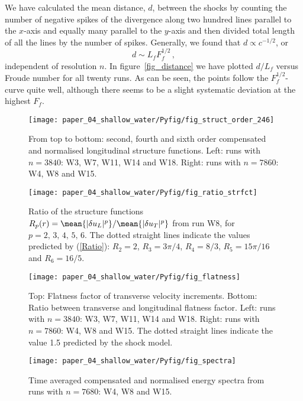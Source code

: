 We have calculated  the mean distance, $ d $, between the shocks by counting the number of negative spikes
of the divergence along two hundred lines parallel to the $ x $-axis and equally many 
parallel to the $ y $-axis and then divided total length of all the lines by
the number of spikes. Generally, we found that $ d \propto c^{-1/2} $, or
\begin{equation} \label{MeanDistance}
d \sim L_f F_f ^{1/2} \, ,
\end{equation}
independent of resolution $ n $. In figure~\ref{fig_distance} we have plotted
$ d/L_f $ versus Froude number for all twenty runs. As can be seen, the points
follow the $ F_f^{1/2} $-curve quite well, although there seems to be a slight
systematic deviation at the highest $ F_f $.

\begin{figure}[htp!]
\centerline{
\texttt{[image: paper\_04\_shallow\_water/Pyfig/fig\_struct\_order\_246]}}
\caption{From top to bottom: second, fourth and sixth order compensated and
normalised longitudinal structure functions. Left: runs with $ n=3840 $: W3,
W7, W11, W14 and W18. Right: runs with $ n = 7860 $: W4, W8 and W15. }
\label{fig_StrucFunc}
\end{figure}

\begin{figure}
\centerline{\texttt{[image: paper\_04\_shallow\_water/Pyfig/fig\_ratio\_strfct]}}
\caption{
Ratio of the structure functions
$R_p(r) = \mean{|\delta u_L|^p} / \mean{|\delta u_T|^p}$ from run W8,
for $ p = 2, \, 3, \, 4, \, 5, \, 6. $
The dotted straight lines indicate the values predicted by (\ref{Ratio}):
$R_2 = 2$, $R_3 = 3\pi/4$,  $R_4 = 8/3$, $ R_5 = 15 \pi /16 $ and $ R_6 = 16/5 $.}
\label{fig_ratio}
\end{figure}

\begin{figure}
\centerline{\texttt{[image: paper\_04\_shallow\_water/Pyfig/fig\_flatness]}}
\caption{ Top: Flatness factor of transverse velocity increments. Bottom: Ratio between transverse and longitudinal flatness factor. Left: runs with $ n=3840 $: W3,
W7, W11,  W14 and W18. Right: runs with $ n = 7860 $: W4, W8 and W15.  The dotted straight lines indicate the value 1.5 predicted by the shock model.  }
\label{fig_flatness}
\end{figure}

\begin{figure}
\centerline{\texttt{[image: paper\_04\_shallow\_water/Pyfig/fig\_spectra]}}
\caption{Time averaged compensated and normalised energy spectra
from runs with $ n = 7680 $: W4, W8 and W15.}
\label{fig_spectra_c40}
\end{figure}

